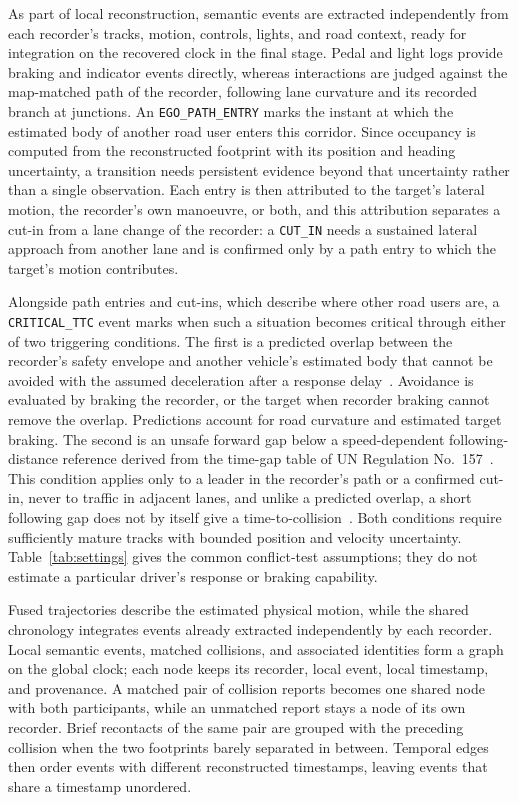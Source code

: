As part of local reconstruction, semantic events are extracted
independently from each recorder's tracks, motion, controls, lights, and
road context, ready for integration on the recovered clock in the final
stage. Pedal and light logs provide braking and indicator events
directly, whereas interactions are judged against the map-matched path
of the recorder, following lane curvature and its recorded branch at
junctions. An \texttt{EGO\_PATH\_ENTRY} marks
the instant at which the estimated body of another road user enters
this corridor. Since occupancy is computed from the reconstructed
footprint with its position and heading uncertainty, a transition
needs persistent evidence beyond that uncertainty rather than a
single observation. Each entry is then attributed to the target's
lateral motion, the recorder's own manoeuvre, or both, and this
attribution separates a cut-in from a lane change of the recorder:
a \texttt{CUT\_IN} needs a sustained lateral approach from another
lane and is confirmed only by a path entry to which the target's
motion contributes.

Alongside path entries and cut-ins, which describe where other road users
are, a \texttt{CRITICAL\_TTC} event marks when such a situation becomes
critical through either of two triggering conditions. The first is a predicted
overlap between the recorder's safety envelope and another vehicle's
estimated body that cannot be avoided with the assumed deceleration
after a response delay~\cite{green2000stop}. Avoidance is evaluated by
braking the recorder, or the target when recorder braking cannot remove
the overlap. Predictions account for road curvature and estimated target
braking. The second is an unsafe forward gap below a speed-dependent
following-distance reference derived from the time-gap table of UN
Regulation No.~157~\cite{unece2021r157}. This condition applies only to a
leader in the recorder's path or a confirmed cut-in, never to
traffic in adjacent lanes, and unlike a predicted overlap, a short
following gap does not by itself give a
time-to-collision~\cite{vogel2003headway}. Both conditions require
sufficiently mature tracks with bounded position and velocity uncertainty.
Table~\ref{tab:settings} gives the common conflict-test assumptions; they
do not estimate a particular driver's response or braking capability.

Fused trajectories describe the estimated physical motion, while the
shared chronology integrates events already extracted independently by
each recorder. Local semantic events, matched collisions, and associated
identities form a graph on the global clock; each node keeps its recorder,
local event, local timestamp, and provenance. A matched pair of collision
reports becomes one shared node with both participants, while an
unmatched report stays a node of its own recorder. Brief recontacts of
the same pair are grouped with the preceding collision when the two
footprints barely separated in between. Temporal edges then order events
with different reconstructed timestamps, leaving events that share a
timestamp unordered.
